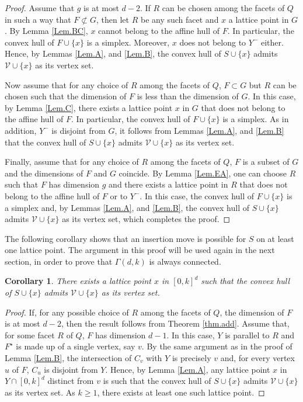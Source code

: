 \documentclass[a4paper]{article}
\newtheorem{corollary}{Corollary}
\begin{document}
\begin{proof}
Assume that $g$ is at most $d-2$. If $R$ can be chosen among the facets of $Q$ in such a way that $F\not\subset{G}$, then let $R$ be any such facet and $x$ a lattice point in $G$. By Lemma \ref{Lem.BC}, $x$ cannot belong to the affine hull of $F$. In particular, the convex hull of $F\cup\{x\}$ is a simplex. Moreover, $x$ does not belong to $Y^-$ either. Hence, by Lemmas \ref{Lem.A}, and \ref{Lem.B}, the convex hull of $S\cup\{x\}$ admits $\mathcal{V}\cup\{x\}$ as its vertex set.

Now assume that for any choice of $R$ among the facets of $Q$, $F\subset{G}$ but $R$ can be chosen such that the dimension of $F$ is less than the dimension of $G$. In this case, by Lemma \ref{Lem.C}, there exists a lattice point $x$ in $G$ that does not belong to the affine hull of $F$. In particular, the convex hull of $F\cup\{x\}$ is a simplex. As in addition, $Y^-$ is disjoint from $G$, it follows from Lemmas \ref{Lem.A}, and \ref{Lem.B} that the convex hull of $S\cup\{x\}$ admits $\mathcal{V}\cup\{x\}$ as its vertex set.

Finally, assume that for any choice of $R$ among the facets of $Q$, $F$ is a subset of $G$ and the dimensions of $F$ and $G$ coincide. By Lemma \ref{Lem.EA}, one can choose $R$ such that $F$ has dimension $g$ and there exists a lattice point in $R$ that does not belong to the affine hull of $F$ or to $Y^-$. In this case, the convex hull of $F\cup\{x\}$ is a simplex and, by Lemmas \ref{Lem.A}, and \ref{Lem.B}, the convex hull of $S\cup\{x\}$ admits $\mathcal{V}\cup\{x\}$ as its vertex set, which completes the proof.
\end{proof}

The following corollary shows that an insertion move is possible for $S$ on at least one lattice point. The argument in this proof will be used again in the next section, in order to prove that $\Gamma(d,k)$ is always connected.

\begin{corollary}\label{cor.add}
There exists a lattice point $x$ in $[0,k]^d$ such that the convex hull of $S\cup\{x\}$ admits $\mathcal{V}\cup\{x\}$ as its vertex set.
\end{corollary}
\begin{proof}
If, for any possible choice of $R$ among the facets of $Q$, the dimension of $F$ is at most $d-2$, then the result follows from Theorem \ref{thm.add}. Assume that, for some facet $R$ of $Q$, $F$ has dimension $d-1$. In this case, $Y$ is parallel to $R$ and $F^\star$ is made up of a single vertex, say $v$. By the same argument as in the proof of Lemma \ref{Lem.B}, the intersection of $C_v$ with $Y$ is precisely $v$ and, for every vertex $u$ of $F$, $C_u$ is disjoint from $Y$. Hence, by Lemma \ref{Lem.A}, any lattice point $x$ in $Y\cap[0,k]^d$ distinct from $v$ is such that the convex hull of $S\cup\{x\}$ admits $\mathcal{V}\cup\{x\}$ as its vertex set. As $k\geq1$, there exists at least one such lattice point.
\end{proof}
\end{document}
